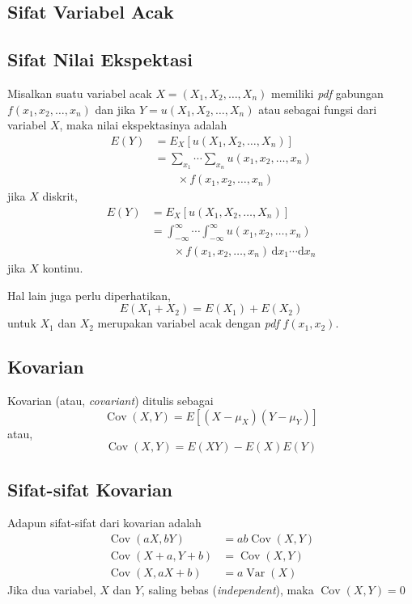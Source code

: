 \documentclass[extrafontsizes, 9pt]{memoir}
\DeclareMathOperator{\Cov}{Cov}
\DeclareMathOperator{\Var}{Var}
\begin{document}
\begin{multicols}{3}
		\section*{\small Sifat Variabel Acak}
			\subsection*{\small Sifat Nilai Ekspektasi}
				Misalkan suatu variabel acak $X = \left(X_{1}, X_{2}, \ldots, X_{n}\right)$ memiliki \textsl{pdf} gabungan $f(x_{1}, x_{2}, \ldots, x_{n})$ dan jika $Y = u\left(X_{1}, X_{2}, \ldots, X_{n}\right)$ atau sebagai fungsi dari variabel $X$, maka nilai ekspektasinya adalah
					\begin{align*}
						E(Y) & = E_{X}\left[u\left(X_{1}, X_{2}, \ldots, X_{n}\right)\right]\\
						& = \sum_{x_{1}}\cdots\sum_{x_{n}}u\left(x_{1}, x_{2}, \ldots, x_{n}\right)\\
						& \qquad \times f(x_{1}, x_{2}, \ldots, x_{n})
					\end{align*}
				jika $X$ diskrit,
					\begin{align*}
						E(Y) & = E_{X}\left[u\left(X_{1}, X_{2}, \ldots, X_{n}\right)\right]\\
						& = \int_{-\infty}^{\infty}\cdots\int_{-\infty}^{\infty}u\left(x_{1}, x_{2}, \ldots, x_{n}\right)\\
						& \qquad \times f(x_{1}, x_{2}, \ldots, x_{n})\,\mathrm{d}x_{1}\cdots\mathrm{d}x_{n}
					\end{align*}
				jika $X$ kontinu.
				
				Hal lain juga perlu diperhatikan,
					\[
						E\left(X_{1} + X_{2}\right) = E(X_{1}) + E(X_{2})
					\]
				untuk $X_{1}$ dan $X_{2}$ merupakan variabel acak dengan \textsl{pdf} $f\left(x_{1}, x_{2}\right)$.
			\subsection*{\small Kovarian}
				Kovarian (atau, \textsl{covariant}) ditulis sebagai
					\[
						\Cov(X, Y) = E\left[(X - \mu_{X})(Y - \mu_{Y})\right]
					\]
				atau,
					\[
						\Cov(X, Y) = E(XY) - E(X)E(Y)
					\]
					
			\subsection*{\small Sifat-sifat Kovarian}
				Adapun sifat-sifat dari kovarian adalah
					\begin{align*}
						\Cov(aX, bY) & = ab\Cov(X, Y)\\
						\Cov(X + a, Y + b) & = \Cov(X, Y)\\
						\Cov(X, aX + b) & = a\Var(X)
					\end{align*}
				Jika dua variabel, $X$ dan $Y$, saling bebas (\textsl{independent}), maka $\Cov(X, Y) = 0$
			

\end{multicols}
\end{document}
